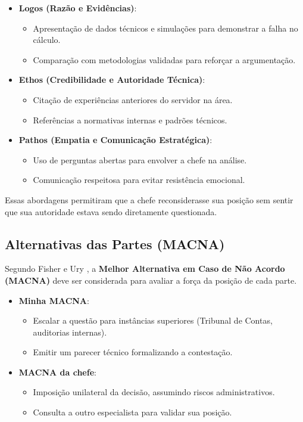 \documentclass[article,12pt,oneside,a4paper]{article}
\begin{document}
\begin{itemize}
\item \textbf{Logos (Razão e Evidências)}:  
\begin{itemize}
\item Apresentação de dados técnicos e simulações para demonstrar a falha no cálculo.
\item Comparação com metodologias validadas para reforçar a argumentação.
\end{itemize}

\item \textbf{Ethos (Credibilidade e Autoridade Técnica)}:  
\begin{itemize}
\item Citação de experiências anteriores do servidor na área.
\item Referências a normativas internas e padrões técnicos.
\end{itemize}

\item \textbf{Pathos (Empatia e Comunicação Estratégica)}:  
\begin{itemize}
\item Uso de perguntas abertas para envolver a chefe na análise.
\item Comunicação respeitosa para evitar resistência emocional.
\end{itemize}
\end{itemize}

Essas abordagens permitiram que a chefe reconsiderasse sua posição sem sentir que sua autoridade estava sendo diretamente questionada.
\subsection{Alternativas das Partes (MACNA)}
\label{sec:org6bb7644}

Segundo Fisher e Ury \cite{fisher1991getting}, a \textbf{Melhor Alternativa em Caso de Não Acordo (MACNA)} deve ser considerada para avaliar a força da posição de cada parte.

\begin{itemize}
\item \textbf{Minha MACNA}:  
\begin{itemize}
\item Escalar a questão para instâncias superiores (Tribunal de Contas, auditorias internas).
\item Emitir um parecer técnico formalizando a contestação.
\end{itemize}

\item \textbf{MACNA da chefe}:  
\begin{itemize}
\item Imposição unilateral da decisão, assumindo riscos administrativos.
\item Consulta a outro especialista para validar sua posição.
\end{itemize}
\end{itemize}
\end{document}
